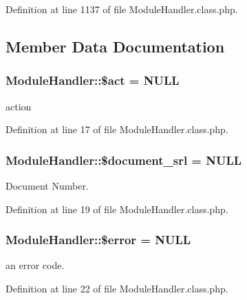 Definition at line 1137 of file Module\+Handler.\+class.\+php.



\subsection{Member Data Documentation}
\hypertarget{classModuleHandler_ae332c92a6ad1e9e823281d708088a0ff}{}
\subsubsection[{\$act}]{\setlength{\rightskip}{0pt plus 5cm}Module\+Handler\+::\$act = N\+U\+L\+L}\label{classModuleHandler_ae332c92a6ad1e9e823281d708088a0ff}


action 



Definition at line 17 of file Module\+Handler.\+class.\+php.

\hypertarget{classModuleHandler_acf9f6062042025aab6a7e10f6b261909}{}
\subsubsection[{\$document\+\_\+srl}]{\setlength{\rightskip}{0pt plus 5cm}Module\+Handler\+::\$document\+\_\+srl = N\+U\+L\+L}\label{classModuleHandler_acf9f6062042025aab6a7e10f6b261909}


Document Number. 



Definition at line 19 of file Module\+Handler.\+class.\+php.

\hypertarget{classModuleHandler_ad81b78f21e42724e73da6808c561159c}{}
\subsubsection[{\$error}]{\setlength{\rightskip}{0pt plus 5cm}Module\+Handler\+::\$error = N\+U\+L\+L}\label{classModuleHandler_ad81b78f21e42724e73da6808c561159c}


an error code. 



Definition at line 22 of file Module\+Handler.\+class.\+php.


